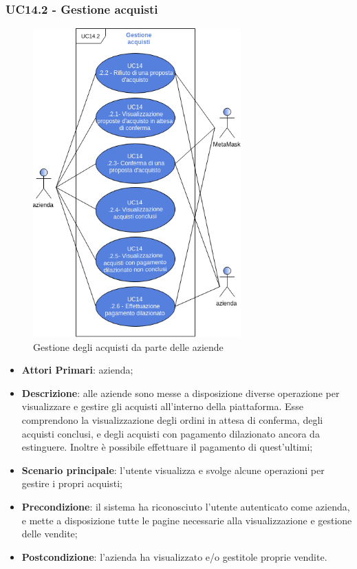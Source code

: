 \subsubsection{UC14.2 - Gestione acquisti}
\begin{figure}[h]
	\includegraphics[width=8cm]{res/images/UC14-Acquisti.png}
	\centering
	\caption{Gestione degli acquisti da parte delle aziende}
\end{figure}
\begin{itemize}
	\item \textbf{Attori Primari}: azienda;
	\item \textbf{Descrizione}: alle aziende sono messe a disposizione diverse operazione per visualizzare e gestire gli acquisti all'interno della piattaforma. Esse comprendono la visualizzazione degli ordini in attesa di conferma, degli acquisti conclusi, e degli acquisti con pagamento dilazionato ancora da estinguere. Inoltre è possibile effettuare il pagamento di quest'ultimi;
	\item \textbf{Scenario principale}: l'utente visualizza e svolge alcune operazioni per gestire i propri acquisti;
	\item \textbf{Precondizione}: il sistema ha riconosciuto l'utente autenticato come azienda, e mette a disposizione tutte le pagine necessarie alla visualizzazione e gestione delle vendite;
	\item \textbf{Postcondizione}: l'azienda ha visualizzato e/o gestitole proprie vendite.
\end{itemize} 



